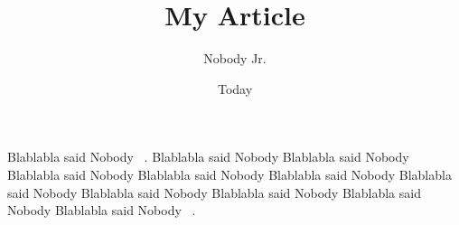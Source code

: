 \documentclass[11pt]{article}
\title{My Article}
\author{Nobody Jr.}
\date{Today}
\begin{document}
\maketitle

\clearpage

Blablabla said Nobody ~\cite{kernighan_ansi_1988}.
Blablabla said Nobody Blablabla said Nobody Blablabla said Nobody
Blablabla said Nobody Blablabla said Nobody Blablabla said Nobody
Blablabla said Nobody Blablabla said Nobody Blablabla said Nobody
Blablabla said Nobody ~\cite{frisch_self-consistent_1984}.

\clearpage





\end{document}
